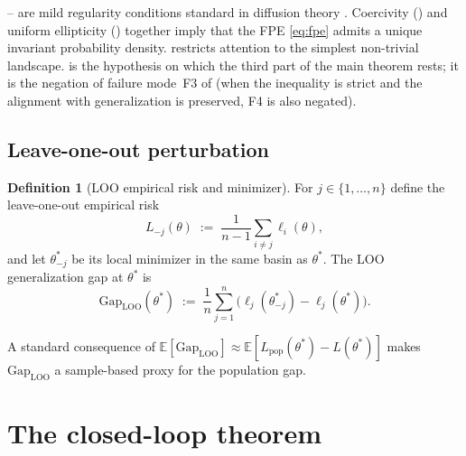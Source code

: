 \documentclass[11pt,a4paper]{article}
\theoremstyle{definition}
\newtheorem{definition}[theorem]{Definition}
\theoremstyle{remark}
\newcommand{\E}{\mathbb{E}}
\newcommand{\Gap}{\mathrm{Gap}}
\newcommand{\LOO}{\mathrm{LOO}}
\begin{document}
-- are mild regularity conditions standard in
diffusion theory \cite{Pavliotis2014}.  Coercivity () and
uniform ellipticity () together imply that the FPE
\eqref{eq:fpe} admits a unique invariant probability density.
 restricts attention to the simplest non-trivial
landscape.   is the hypothesis on which the third part of the
main theorem rests; it is the negation of failure mode~F3
of \cite{paperB} (when the inequality is strict and the alignment with
generalization is preserved, F4 is also negated).

\subsection{Leave-one-out perturbation}

\begin{definition}[LOO empirical risk and minimizer]\label{def:LOO}
   For $j\in\{1,\dots,n\}$ define the leave-one-out empirical risk
   \[
      L_{-j}(\theta) \;:=\; \frac{1}{n-1}\sum_{i\neq j} \ell_i(\theta),
   \]
   and let $\theta^*_{-j}$ be its local minimizer in the same basin as
   $\theta^*$.  The LOO generalization gap at $\theta^*$ is
   \[
      \Gap_{\LOO}(\theta^*) \;:=\;
      \frac{1}{n}\sum_{j=1}^n
      \bigl(\ell_j(\theta^*_{-j}) - \ell_j(\theta^*)\bigr).
   \]
\end{definition}

A standard consequence of $\E[\Gap_{\LOO}] \approx \E[L_{\text{pop}}(\theta^*)
   - L(\theta^*)]$ \cite{BousquetElisseeff2002,MohriRostamizadehTalwalkar2018}
makes $\Gap_{\LOO}$ a sample-based proxy for the population gap.

\section{The closed-loop theorem}\label{sec:theorem-statement}
\end{document}
